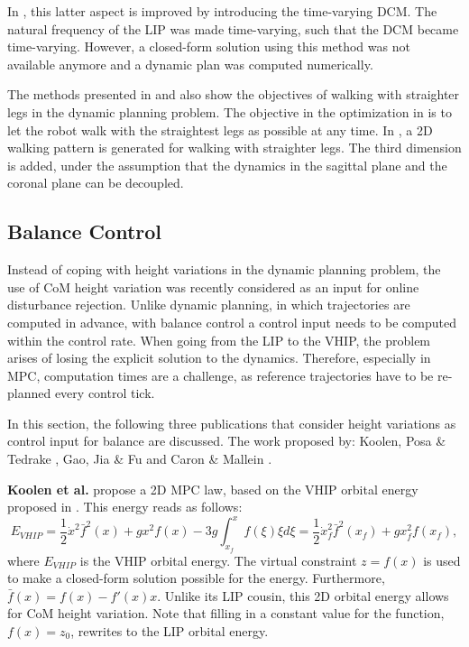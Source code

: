 In \cite{hopkins2014humanoid}, this latter aspect is improved by introducing the time-varying \ac{DCM}. The natural frequency of the \ac{LIP} was made time-varying, such that the \ac{DCM} became time-varying. However, a closed-form solution using this method was not available anymore and a dynamic plan was computed numerically.

The methods presented in \cite{brasseur2015robust} and \cite{kajita2017biped} also show the objectives of walking with straighter legs in the dynamic planning problem. The objective in the optimization in \cite{brasseur2015robust} is to let the robot walk with the straightest legs as possible at any time. In \cite{kajita2017biped}, a \ac{2D} walking pattern is generated for walking with straighter legs. The third dimension is added, under the assumption that the dynamics in the sagittal plane and the coronal plane can be decoupled. 
\subsection{Balance Control}\label{subsec:heightbalance}
Instead of coping with height variations in the dynamic planning problem, the use of \ac{CoM} height variation was recently considered as an input for online disturbance rejection. Unlike dynamic planning, in which trajectories are computed in advance, with balance control a control input needs to be computed within the control rate. When going from the \ac{LIP} to the \ac{VHIP}, the problem arises of losing the explicit solution to the dynamics. Therefore, especially in \ac{MPC}, computation times are a challenge, as reference trajectories have to be re-planned every control tick.

In this section, the following three publications that consider height variations as control input for balance are discussed. The work proposed by: Koolen, Posa \& Tedrake \cite{koolen2016balance},  Gao, Jia \& Fu \cite{gao2017increase} and  Caron \& Mallein \cite{caron2018balance}.

\textbf{Koolen et al.} \cite{koolen2016balance} propose a \ac{2D} \ac{MPC} law, based on the \ac{VHIP} orbital energy proposed in \cite{pratt2007derivation}. This energy reads as follows:
\begin{equation}\label{eq:evhip}
    E_{VHIP}  = \frac{1}{2}\dot{x}^2\bar{f}^2(x)+gx^2f(x) - 3g\int_{x_f}^{x} f(\xi)\xi d\xi = \frac{1}{2}\dot{x}_f^2\bar{f}^2(x_f)+gx_f^2f(x_f),
\end{equation}
where $E_{VHIP}$ is the \ac{VHIP} orbital energy. The virtual constraint $z=f(x)$ is used to make a closed-form solution possible for the energy. Furthermore, $\bar{f}(x)=f(x)-f'(x)x$. Unlike its \ac{LIP} cousin, this \ac{2D} orbital energy allows for \ac{CoM} height variation. Note that filling in a constant value for the function, $f(x)=z_0$, rewrites to the \ac{LIP} orbital energy.


